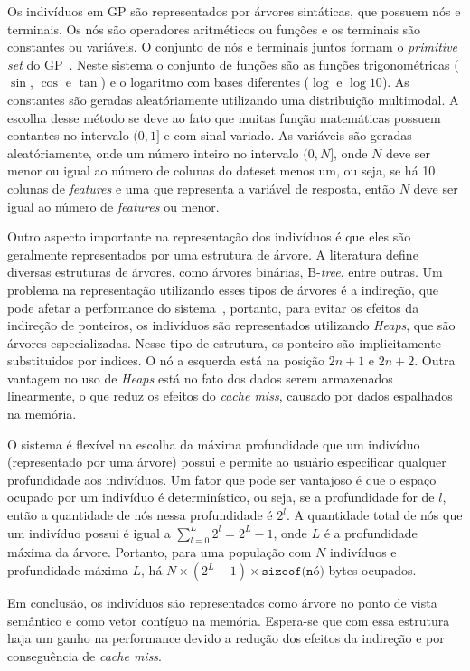 \documentclass[a4paper]{paper}
\begin{document}
Os indivíduos em GP são representados por árvores sintáticas, que possuem nós e
terminais. Os nós são operadores aritméticos ou funções e os terminais são
constantes ou variáveis. O conjunto de nós e terminais juntos formam o
\textit{primitive set} do GP~\citep{poli2008}. Neste sistema o conjunto de
funções são as funções trigonométricas ($\sin$, $\cos$ e $\tan$) e o logaritmo
com bases diferentes ($\log$ e $\log10$). As constantes são geradas
aleatóriamente utilizando uma distribuição multimodal. A escolha desse método se
deve ao fato que muitas função matemáticas possuem contantes no intervalo $(0,
1]$ e com sinal variado.  As variáveis são geradas aleatóriamente, onde um
  número inteiro no intervalo $(0, N]$, onde $N$ deve ser menor ou igual ao
    número de colunas do dateset menos um, ou seja, se há 10 colunas de
    \textit{features} e uma que representa a variável de resposta, então $N$
    deve ser igual ao número de \textit{features} ou menor.

Outro aspecto importante na representação dos indivíduos é que eles são
geralmente representados por uma estrutura de árvore. A literatura define
diversas estruturas de árvores, como árvores binárias, B-\textit{tree}, entre
outras. Um problema na representação utilizando esses tipos de árvores é a
indireção, que pode afetar a performance do sistema~\citep{faria2013}, portanto,
para evitar os efeitos da indireção de ponteiros, os indivíduos são
representados utilizando \textit{Heaps}, que são árvores especializadas. Nesse
tipo de estrutura, os ponteiro são implicitamente substituidos por indices. O nó
a esquerda está na posição $2n+1$ e $2n + 2$. Outra vantagem no uso de
\textit{Heaps} está no fato dos dados serem armazenados linearmente, o que reduz
os efeitos do \textit{cache miss}, causado por dados espalhados na memória.

O sistema é flexível na escolha da máxima profundidade que um indivíduo
(representado por uma árvore) possui e permite ao usuário especificar qualquer
profundidade aos indivíduos.  Um fator que pode ser vantajoso é que o espaço
ocupado por um indivíduo é determinístico, ou seja, se a profundidade for de
$l$, então a quantidade de nós nessa profundidade é $2^l$.  A quantidade total
de nós que um indivíduo possui é igual a $\sum_{l=0}^{L}2^l=2^{L}-1$, onde $L$ é
a profundidade máxima da árvore. Portanto, para uma população com $N$ indivíduos
e profundidade máxima $L$, há $N\times(2^{L}-1)\times\texttt{sizeof(nó)}$ bytes
ocupados.

Em conclusão, os indivíduos são representados como árvore no ponto de vista
semântico e como vetor contíguo na memória.  Espera-se que com essa estrutura
haja um ganho na performance devido a redução dos efeitos da indireção e por
conseguência de \textit{cache miss}.
\end{document}
